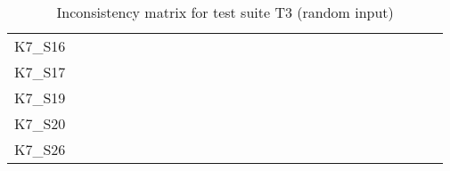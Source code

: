 \begin{table}[htpb]
\begin{tabular}{l|rrrrrrrrrrrrrrrrrrrrrrrrrr}
        K7\_S16 & \n & \n & \n & \e & \n & \n & \n & \n & \n & \n & \n & \n & \n & \n & \n & \n & \n & \n & \n & \e & \n & \n & \e & \n & \n & \n \\
        K7\_S17 & \n & \n & \n & \n & \n & \n & \n & \n & \e & \n & \n & \n & \n & \n & \n & \n & \n & \n & \n & \e & \n & \n & \e & \n & \e & \n \\
        K7\_S19 & \n & \n & \n & \n & \n & \n & \n & \n & \n & \n & \n & \n & \n & \e & \n & \n & \n & \n & \n & \n & \e & \n & \n & \e & \n & \n \\
        K7\_S20 & \n & \n & \n & \n & \n & \n & \n & \n & \n & \n & \n & \n & \n & \n & \n & \n & \n & \n & \n & \n & \n & \n & \n & \n & \n & \n \\
        K7\_S26 & \n & \n & \n & \n & \n & \n & \n & \n & \n & \n & \n & \n & \n & \n & \n & \n & \n & \n & \n & \n & \n & \e & \n & \n & \n & \n \\
        \bottomrule
    \end{tabular}
    \caption{Inconsistency matrix for test suite T3 (random input)}
    \label{tab:inconsistencies_matrix_random}
    \setlength{\tabcolsep}{\defaulttabcolsep}
\end{table}


